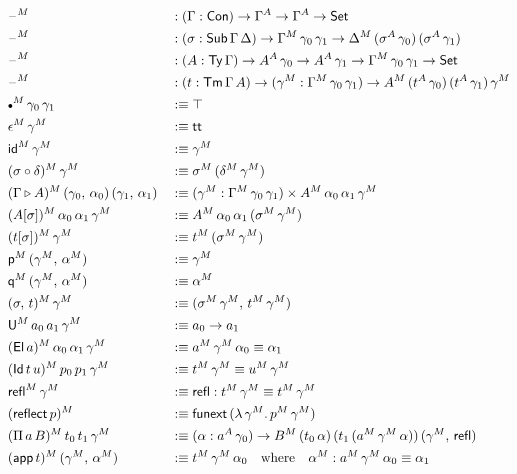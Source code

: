 \documentclass[12pt,a4paper,twoside,openany]{book}
\theoremstyle{remark}
\theoremstyle{definition}
\theoremstyle{theorem}
\newcommand{\ms}[1]{\mathsf{#1}}
\newcommand{\funext}{\ms{funext}}
\newcommand{\refl}{\mathsf{refl}}
\newcommand{\reflect}{\mathsf{reflect}}
\newcommand{\id}{\mathsf{id}}
\newcommand{\Con}{\mathsf{Con}}
\newcommand{\Sub}{\mathsf{Sub}}
\newcommand{\Tm}{\mathsf{Tm}}
\newcommand{\Ty}{\mathsf{Ty}}
\newcommand{\U}{\mathsf{U}}
\newcommand{\El}{\mathsf{El}}
\newcommand{\Id}{\mathsf{Id}}
\renewcommand{\tt}{\mathsf{tt}}
\newcommand{\blank}{\mathord{\hspace{1pt}\text{--}\hspace{1pt}}}
\newcommand{\Set}{\mathsf{Set}}
\newcommand{\ext}{\triangleright}
\newcommand{\emptycon}{\scaleobj{.75}\bullet}
\newcommand{\p}{\mathsf{p}}
\newcommand{\q}{\mathsf{q}}
\newcommand{\app}{\ms{app}}
\newcommand{\defn}{:\equiv}
\begin{document}
\begin{alignat*}{3}
  &\blank^M &&: (\Gamma : \Con) \to \Gamma^A \to \Gamma^A \to \Set\\
  &\blank^M &&: (\sigma : \Sub\,\Gamma\,\Delta) \to \Gamma^M\,\gamma_0\,\gamma_1 \to \Delta^M\,(\sigma^A\,\gamma_0)\,(\sigma^A\,\gamma_1)\\
  &\blank^M &&: (A : \Ty\,\Gamma) \to A^A\,\gamma_0 \to A^A\,\gamma_1 \to \Gamma^M\,\gamma_0\,\gamma_1 \to \Set\\
  &\blank^M &&: (t : \Tm\,\Gamma\,A) \to (\gamma^M : \Gamma^M\,\gamma_0\,\gamma_1) \to A^M\,(t^A\,\gamma_0)\,(t^A\,\gamma_1)\,\gamma^M\\
  &\emptycon^M\,\gamma_0\,\gamma_1 &&\defn \top \\
  &\epsilon^M\,\gamma^M &&\defn \tt\\
  &\id^M\,\gamma^M &&\defn \gamma^M\\
  &(\sigma \circ \delta)^M\,\gamma^M &&\defn \sigma^M\,(\delta^M\,\gamma^M)\\
  &(\Gamma \ext A)^M\,(\gamma_0,\,\alpha_0)\,(\gamma_1,\,\alpha_1) &&\defn
    (\gamma^M : \Gamma^M\,\gamma_0\,\gamma_1) \times A^M\,\alpha_0\,\alpha_1\,\gamma^M\\
  &(A[\sigma])^M\,\alpha_0\,\alpha_1\,\gamma^M &&\defn A^M\,\alpha_0\,\alpha_1\,(\sigma^M\,\gamma^M)\\
  &(t[\sigma])^M\,\gamma^M &&\defn t^M\,(\sigma^M\,\gamma^M)\\
  &\p^M\,(\gamma^M,\,\alpha^M) &&\defn \gamma^M\\
  &\q^M\,(\gamma^M,\,\alpha^M) &&\defn \alpha^M\\
  &(\sigma,\,t)^M\,\gamma^M &&\defn (\sigma^M\,\gamma^M,\,t^M\,\gamma^M)\\
  &\U^M\,a_0\,a_1\,\gamma^M &&\defn a_0 \to a_1\\
  &(\El\,a)^M\,\alpha_0\,\alpha_1\,\gamma^M &&\defn a^M\,\gamma^M\,\alpha_0 \equiv \alpha_1 \\
  &(\Id\,t\,u)^M\,p_0\,p_1\,\gamma^M &&\defn t^M\,\gamma^M \equiv u^M\,\gamma^M\\
  &\refl^M\,\gamma^M &&\defn \refl : t^M\,\gamma^M \equiv t^M\,\gamma^M\\
  &(\reflect\,p)^M &&\defn \funext\,(\lambda\,\gamma^M.\,p^M\,\gamma^M)\\
  &(\Pi\,a\,B)^M\,t_0\,t_1\,\gamma^M &&\defn (\alpha : a^A\,\gamma_0) \to B^M\,(t_0\,\alpha)\,(t_1\,(a^M\,\gamma^M\,\alpha))\,(\gamma^M,\,\refl)\\
  &(\app\,t)^M\,(\gamma^M,\,\alpha^M) &&\defn t^M\,\gamma^M\,\alpha_0\hspace{1em}\text{where}\hspace{1em} \alpha^M : a^M\,\gamma^M\,\alpha_0 \equiv \alpha_1\\

\end{alignat*}
\end{document}

